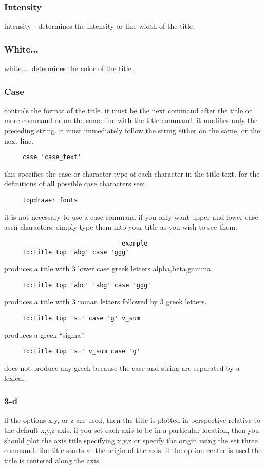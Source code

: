 \subsubsection{Intensity}
intensity - determines the intensity or line width of the title.  
\subsubsection{White...}
white....  determines the color of the title.  
\subsubsection{Case}
controls  the  format  of the title.  it must be the next command after
the title or more command or on the same line with the  title  command.
it  modifies only the preceding string.  it must immediately follow the
string either on the same, or the next line.  

\begin{verbatim}
     case 'case_text' 
\end{verbatim}

this  specifies  the  case  or  character type of each character in the
title text.  for the definitions of all possible case characters see:  
\begin{verbatim}
     topdrawer fonts 
\end{verbatim}

it  is  not  necessary to use a case command if you only want upper and
lower case ascii characters.  simply type them into your title  as  you
wish to see them.  

\begin{verbatim}
                                example
     td:title top 'abg' case 'ggg' 
\end{verbatim}
produces a title with 3 lower case greek letters alpha,beta,gamma.  
\begin{verbatim}
     td:title top 'abc' 'abg' case 'ggg' 
\end{verbatim}
produces a title with 3 roman letters followed by 3 greek letters.  
\begin{verbatim}
     td:title top 's=' case 'g' v_sum 
\end{verbatim}
produces a greek ``sigma''.  
\begin{verbatim}
     td:title top 's=' v_sum case 'g' 
\end{verbatim}
does not produce any greek because the case and string are separated by
a lexical.  
\subsubsection{3-d}
if  the  options  x,y,  or  z  are  used,  then the title is plotted in
perspective relative to the default x,y,z axis.  if you set  each  axis
to  be  in  a  particular location, then you should plot the axis title
specifying x,y,z or specify the origin  using  the  set three  command.
the  title  starts  at the origin of the axis.  if the option center is
used the title is centered along the axis.  

